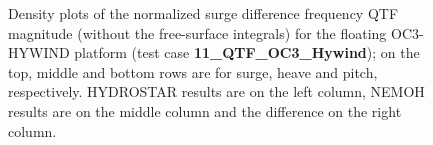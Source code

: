 \documentclass[12pt,a4paper,titlepage]{article}
\begin{document}
\begin{figure}[h!tbp]
	\centering
{}
	\caption{Density plots of the normalized surge difference frequency QTF magnitude (without the free-surface integrals) for the floating OC3-HYWIND platform (test case \textbf{11\_QTF\_OC3\_Hywind}); on the top, middle and bottom rows are for surge, heave and pitch, respectively. HYDROSTAR results are on the left column, NEMOH results are on the middle column and the difference on the right column.}\label{fig:QTFM_OC3_HYWIND}
\end{figure}
\end{document}
